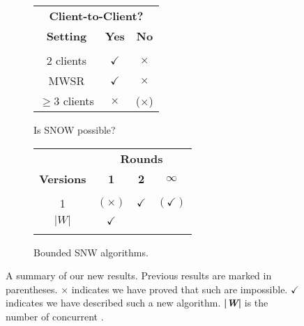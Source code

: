 \begin{figure}[t]
  \centering
  \begin{subfigure}[b]{0.49\columnwidth} {
      \begin{center}
\begin{tabular}{@{}c c c@{}}
  \midrule
                   \multicolumn{3}{c}{\phantom{ABCDef}\textbf{Client-to-Client?}}\\
  \textbf{Setting} & \textbf{Yes}        & \textbf{No}\\
  \hline\\[-1.8ex]
  2 clients        & $\checkmark$   & $\times$ \\
  MWSR             & $\checkmark$   & $\times$ \\
  $\ge 3$ clients  & $\times$       & ($\times$)\\
  \midrule
\end{tabular}
      \end{center}
    }
    \caption{Is SNOW possible?}
    \label{fig:contr_table_a}
  \end{subfigure}
  \hfill
  \begin{subfigure}[b]{0.49\columnwidth} {
      \begin{center}
\begin{tabular}{@{}c c c c@{}}
  \midrule          
  & \multicolumn{3}{c}{\phantom{a}\textbf{Rounds}}\\
  \textbf{Versions} & \textbf{1}    & \textbf{2}    & $\boldsymbol{\infty}$ \\
  \hline\\[-1.8ex]
                1   & $(\times)$    & $\checkmark$  & $(\checkmark)$ \\
              $|W|$ & $\checkmark$  &  & \\
  \midrule\\
\end{tabular}
      \end{center}
    }
    \caption{Bounded SNW algorithms.}
    \label{fig:contr_table_b}
  \end{subfigure} 
  \caption{A summary of our new results.  Previous results are marked in parentheses.
    $\times$ indicates we have proved that such \rots{} are impossible.
    $\checkmark$ indicates we have described such a new \rot{} algorithm. %
    \textbf{|\textit{W}|} is the number of concurrent \wots{}.}
  \label{tbl:result_map}
\end{figure}
